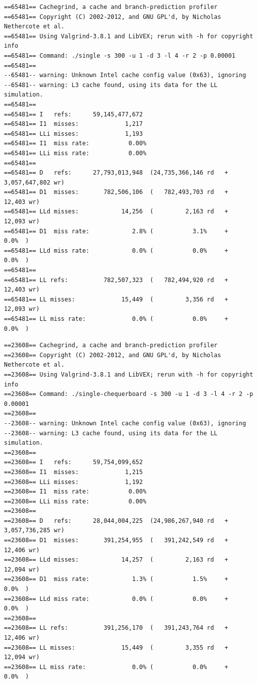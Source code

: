 \documentclass{report}
\begin{document}
\begin{lstlisting}[style=customv,caption=Version 1 Cachegrind]
==65481== Cachegrind, a cache and branch-prediction profiler
==65481== Copyright (C) 2002-2012, and GNU GPL'd, by Nicholas Nethercote et al.
==65481== Using Valgrind-3.8.1 and LibVEX; rerun with -h for copyright info
==65481== Command: ./single -s 300 -u 1 -d 3 -l 4 -r 2 -p 0.00001
==65481==
--65481-- warning: Unknown Intel cache config value (0x63), ignoring
--65481-- warning: L3 cache found, using its data for the LL simulation.
==65481==
==65481== I   refs:      59,145,477,672
==65481== I1  misses:             1,217
==65481== LLi misses:             1,193
==65481== I1  miss rate:           0.00%
==65481== LLi miss rate:           0.00%
==65481==
==65481== D   refs:      27,793,013,948  (24,735,366,146 rd   + 3,057,647,802 wr)
==65481== D1  misses:       782,506,106  (   782,493,703 rd   +        12,403 wr)
==65481== LLd misses:            14,256  (         2,163 rd   +        12,093 wr)
==65481== D1  miss rate:            2.8% (           3.1%     +           0.0%  )
==65481== LLd miss rate:            0.0% (           0.0%     +           0.0%  )
==65481==
==65481== LL refs:          782,507,323  (   782,494,920 rd   +        12,403 wr)
==65481== LL misses:             15,449  (         3,356 rd   +        12,093 wr)
==65481== LL miss rate:             0.0% (           0.0%     +           0.0%  )
\end{lstlisting}
\begin{lstlisting}[style=customv,caption=Version 2 Cachegrind]
==23608== Cachegrind, a cache and branch-prediction profiler
==23608== Copyright (C) 2002-2012, and GNU GPL'd, by Nicholas Nethercote et al.
==23608== Using Valgrind-3.8.1 and LibVEX; rerun with -h for copyright info
==23608== Command: ./single-chequerboard -s 300 -u 1 -d 3 -l 4 -r 2 -p 0.00001
==23608==
--23608-- warning: Unknown Intel cache config value (0x63), ignoring
--23608-- warning: L3 cache found, using its data for the LL simulation.
==23608==
==23608== I   refs:      59,754,099,652
==23608== I1  misses:             1,215
==23608== LLi misses:             1,192
==23608== I1  miss rate:           0.00%
==23608== LLi miss rate:           0.00%
==23608==
==23608== D   refs:      28,044,004,225  (24,986,267,940 rd   + 3,057,736,285 wr)
==23608== D1  misses:       391,254,955  (   391,242,549 rd   +        12,406 wr)
==23608== LLd misses:            14,257  (         2,163 rd   +        12,094 wr)
==23608== D1  miss rate:            1.3% (           1.5%     +           0.0%  )
==23608== LLd miss rate:            0.0% (           0.0%     +           0.0%  )
==23608==
==23608== LL refs:          391,256,170  (   391,243,764 rd   +        12,406 wr)
==23608== LL misses:             15,449  (         3,355 rd   +        12,094 wr)
==23608== LL miss rate:             0.0% (           0.0%     +           0.0%  )
\end{lstlisting}
\end{document}
